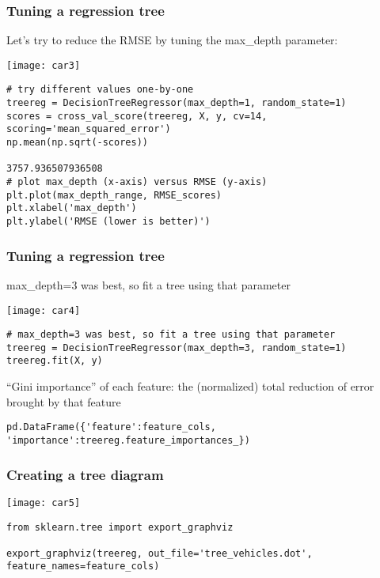 \begin{frame}[fragile]\frametitle{Tuning a regression tree}
Let's try to reduce the RMSE by tuning the max\_depth parameter:

\begin{center}
\texttt{[image: car3]}
\end{center}

\begin{lstlisting}
# try different values one-by-one
treereg = DecisionTreeRegressor(max_depth=1, random_state=1)
scores = cross_val_score(treereg, X, y, cv=14, scoring='mean_squared_error')
np.mean(np.sqrt(-scores))

3757.936507936508
# plot max_depth (x-axis) versus RMSE (y-axis)
plt.plot(max_depth_range, RMSE_scores)
plt.xlabel('max_depth')
plt.ylabel('RMSE (lower is better)')
\end{lstlisting}

\end{frame}

\begin{frame}[fragile]\frametitle{Tuning a regression tree}
max\_depth=3 was best, so fit a tree using that parameter

\begin{center}
\texttt{[image: car4]}
\end{center}

\begin{lstlisting}
# max_depth=3 was best, so fit a tree using that parameter
treereg = DecisionTreeRegressor(max_depth=3, random_state=1)
treereg.fit(X, y)
\end{lstlisting}
``Gini importance'' of each feature: the (normalized) total reduction of error brought by that feature
\begin{lstlisting}
pd.DataFrame({'feature':feature_cols, 'importance':treereg.feature_importances_})
\end{lstlisting}

\end{frame}

\begin{frame}[fragile]\frametitle{Creating a tree diagram}

\begin{center}
\texttt{[image: car5]}
\end{center}


\begin{lstlisting}
from sklearn.tree import export_graphviz

export_graphviz(treereg, out_file='tree_vehicles.dot', feature_names=feature_cols)
\end{lstlisting}

\end{frame}

